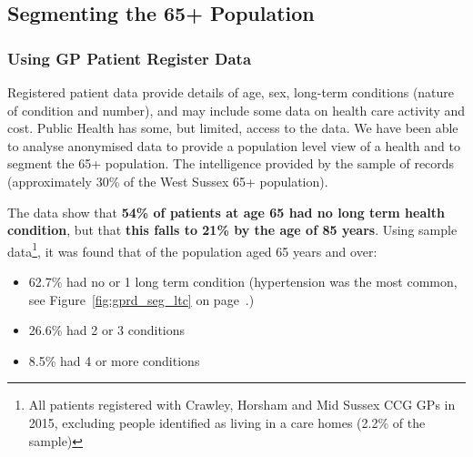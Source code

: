 \subsection{Segmenting the 65+ Population}
\subsubsection{Using GP Patient Register Data}
Registered patient data provide details of age, sex, long-term conditions (nature of condition and number), and may include some data on health care activity and cost. Public Health has some, but limited, access to the data. We have been able to analyse anonymised data to provide a population level view of a health and to segment the 65+ population. The intelligence provided by the sample of records (approximately 30\% of the West Sussex 65+ population).

The data show that {\bfseries 54\% of patients at age 65 had no long term health condition}, but that {\bfseries this falls to 21\% by the age of 85 years}. Using sample data\footnote{All patients registered with Crawley, Horsham and Mid Sussex CCG GPs in 2015, excluding people identified as living in a care homes (2.2\% of the sample)}, it was found that of the population aged 65 years and over: 
\begin{itemize}[noitemsep]
    \item 62.7\% had no or 1 long term condition (hypertension was the most common, see Figure~\ref{fig:gprd_seg_ltc} on page~\pageref{fig:gprd_seg_ltc}.)
    \item 26.6\% had 2 or 3 conditions
    \item 8.5\% had 4 or more conditions
\end{itemize}

